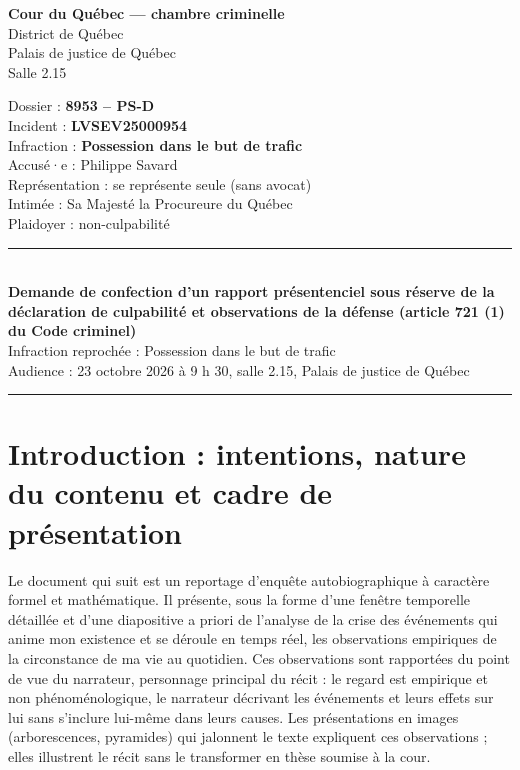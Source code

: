 \documentclass[12pt,letterpaper,oneside]{article}
\begin{document}
\thispagestyle{empty}
\begin{minipage}[t]{0.60\textwidth}
\textbf{Cour du Québec — chambre criminelle}\\
District de Québec\\
Palais de justice de Québec\\
Salle 2.15
\end{minipage}\hfill
\begin{minipage}[t]{0.37\textwidth}
\raggedleft
Dossier : \textbf{8953 – PS-D}\\
Incident : \textbf{LVSEV25000954}\\
Infraction : \textbf{Possession dans le but de trafic}\\
Accusé·e : Philippe Savard\\
Représentation : se représente seule (sans avocat)\\
Intimée : Sa Majesté la Procureure du Québec\\
Plaidoyer : non-culpabilité
\end{minipage}
\vspace{0.8cm}
\begin{center}
\rule{\textwidth}{0.4pt}\\[0.4em]
\textbf{\large Demande de confection d'un rapport présentenciel sous réserve de la déclaration de culpabilité et observations de la défense (article 721 (1) du Code criminel)}\\[0.3em]
Infraction reprochée : Possession dans le but de trafic\\
Audience : 23 octobre 2026 à 9 h 30, salle 2.15, Palais de justice de Québec
\rule{\textwidth}{0.4pt}
\end{center}

\vspace{1em}
\tableofcontents
\newpage

\section*{Introduction : intentions, nature du contenu et cadre de présentation}

Le document qui suit est un reportage d'enquête autobiographique à caractère formel et mathématique. Il présente, sous la forme d'une fenêtre temporelle détaillée et d'une diapositive a priori de l'analyse de la crise des événements qui anime mon existence et se déroule en temps réel, les observations empiriques de la circonstance de ma vie au quotidien. Ces observations sont rapportées du point de vue du narrateur, personnage principal du récit : le regard est empirique et non phénoménologique, le narrateur décrivant les événements et leurs effets sur lui sans s'inclure lui-même dans leurs causes. Les présentations en images (arborescences, pyramides) qui jalonnent le texte expliquent ces observations ; elles illustrent le récit sans le transformer en thèse soumise à la cour.
\end{document}
